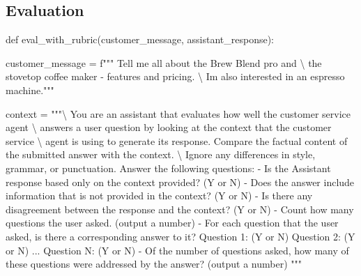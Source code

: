\documentclass[
  letterpaper,
  DIV=11,
  numbers=noendperiod]{scrreprt}
\newenvironment{Shaded}{\begin{snugshade}}{\end{snugshade}}
\newcommand{\CharTok}[1]{\textcolor[rgb]{0.13,0.47,0.30}{#1}}
\newcommand{\KeywordTok}[1]{\textcolor[rgb]{0.00,0.23,0.31}{#1}}
\newcommand{\NormalTok}[1]{\textcolor[rgb]{0.00,0.23,0.31}{#1}}
\newcommand{\OperatorTok}[1]{\textcolor[rgb]{0.37,0.37,0.37}{#1}}
\newcommand{\SpecialStringTok}[1]{\textcolor[rgb]{0.13,0.47,0.30}{#1}}
\newcommand{\StringTok}[1]{\textcolor[rgb]{0.13,0.47,0.30}{#1}}
\begin{document}
\hypertarget{evaluation}{%
\subsection{Evaluation}\label{evaluation}}

\begin{Shaded}
\begin{Highlighting}[]
\KeywordTok{def}\NormalTok{ eval\_with\_rubric(customer\_message, assistant\_response):}

\NormalTok{    customer\_message }\OperatorTok{=} \SpecialStringTok{f"""}
\SpecialStringTok{    Tell me all about the Brew Blend pro and }\CharTok{\textbackslash{}}
\SpecialStringTok{    the stovetop coffee maker {-} features and pricing. }\CharTok{\textbackslash{}}
\SpecialStringTok{    I\textquotesingle{}m also interested in an espresso machine."""}

\NormalTok{    context }\OperatorTok{=} \StringTok{"""}\CharTok{\textbackslash{}}
\StringTok{    You are an assistant that evaluates how well the customer service agent }\CharTok{\textbackslash{}}
\StringTok{    answers a user question by looking at the context that the customer service }\CharTok{\textbackslash{}}
\StringTok{    agent is using to generate its response.}
\StringTok{    Compare the factual content of the submitted answer with the context. }\CharTok{\textbackslash{}}
\StringTok{    Ignore any differences in style, grammar, or punctuation.}
\StringTok{    Answer the following questions:}
\StringTok{        {-} Is the Assistant response based only on the context provided? (Y or N)}
\StringTok{        {-} Does the answer include information that is not provided in the context? (Y or N)}
\StringTok{        {-} Is there any disagreement between the response and the context? (Y or N)}
\StringTok{        {-} Count how many questions the user asked. (output a number)}
\StringTok{        {-} For each question that the user asked, is there a corresponding answer to it?}
\StringTok{          Question 1: (Y or N)}
\StringTok{          Question 2: (Y or N)}
\StringTok{          ...}
\StringTok{          Question N: (Y or N)}
\StringTok{        {-} Of the number of questions asked, how many of these questions were addressed by the answer? (output a number)}
\StringTok{    """}


\end{Highlighting}
\end{Shaded}
\end{document}
